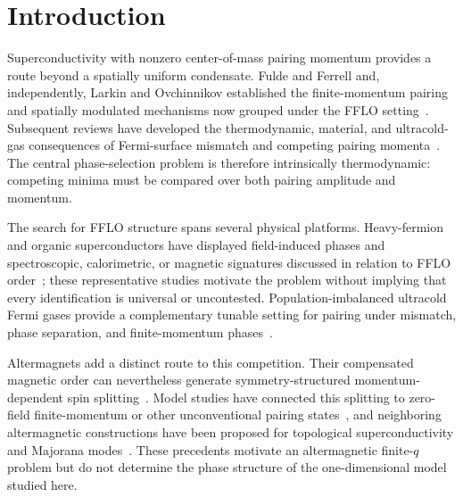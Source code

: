 \section{Introduction}
Superconductivity with nonzero center-of-mass pairing momentum provides a route beyond a spatially uniform condensate. Fulde and Ferrell and, independently, Larkin and Ovchinnikov established the finite-momentum pairing and spatially modulated mechanisms now grouped under the FFLO setting~\cite{FuldeFerrell1964,LarkinOvchinnikov1965}. Subsequent reviews have developed the thermodynamic, material, and ultracold-gas consequences of Fermi-surface mismatch and competing pairing momenta~\cite{CasalbuoniNardulli2004,MatsudaShimahara2007,KinnunenEtAl2018}. The central phase-selection problem is therefore intrinsically thermodynamic: competing minima must be compared over both pairing amplitude and momentum.

The search for FFLO structure spans several physical platforms. Heavy-fermion and organic superconductors have displayed field-induced phases and spectroscopic, calorimetric, or magnetic signatures discussed in relation to FFLO order~\cite{RadovanEtAl2003,BianchiEtAl2003,KenzelmannEtAl2008,LortzEtAl2007,MayaffreEtAl2014}; these representative studies motivate the problem without implying that every identification is universal or uncontested. Population-imbalanced ultracold Fermi gases provide a complementary tunable setting for pairing under mismatch, phase separation, and finite-momentum phases~\cite{LiaoEtAl2010,ZwierleinEtAl2006,PartridgeEtAl2006,SheehyRadzihovsky2007,RadzihovskySheehy2010}.

Altermagnets add a distinct route to this competition. Their compensated magnetic order can nevertheless generate symmetry-structured momentum-dependent spin splitting~\cite{SmejkalSinovaJungwirth2022,SmejkalEtAl2022,Mazin2022,SmejkalEtAl2020}. Model studies have connected this splitting to zero-field finite-momentum or other unconventional pairing states~\cite{ChakrabortyBlackSchaffer2024,HongParkKim2025,BoseVadnaisParamekanti2024}, and neighboring altermagnetic constructions have been proposed for topological superconductivity and Majorana modes~\cite{ZhuEtAl2023,GhorashiHughesCano2024}. These precedents motivate an altermagnetic finite-$q$ problem but do not determine the phase structure of the one-dimensional model studied here.


